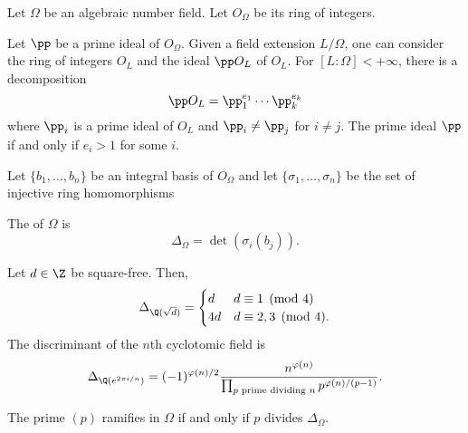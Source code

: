 \documentclass [preview, border = 20pt] {standalone}
\begin{document}
\pagecolor{black}
\color{white}

\setlength{\parskip}{1 em}

Let $\Omega$ be an algebraic number field. Let $O_\Omega$ be its ring of integers. 

Let $\pp$ be a prime ideal of $ O_\Omega$. Given a field extension $L/\Omega$, one can consider the ring of integers $ O_L$ and the ideal $\pp O_L$ of $ O_L$. For $[L:\Omega]<+\infty$, there is a decomposition
\[
\pp  O_L = \pp_1^{e_1} \cdots \pp_k^{e_k}
\]
where $\pp_i$ is a prime ideal of $ O_L$ and $\pp_i\ne \pp_j$ for $i\ne j$. The prime ideal $\pp$  if and only if $e_i>1$ for some $i$. 

Let $\{b_1,\hdots,b_n\}$ be an integral basis of $ O_\Omega$ and let $\{\sigma_1,\hdots,\sigma_n\}$ be the set of injective ring homomorphisms
\begin{center}
\end{center}
The  of $\Omega$ is
\[
\Delta_\Omega = \det(\sigma_i(b_j)).
\]

Let $d\in \Z$ be square-free. Then,
\[
\Delta_{\Q(\sqrt d)} = \begin{cases}
d&{d\equiv 1\pmod 4}\\ 4d & d\equiv 2,3\pmod 4.
\end{cases}
\]
The discriminant of the $n$th cyclotomic field is 
\[
\Delta_{\Q(e^{2\pi i/n})} = (-1)^{\varphi(n)/2} \frac{n^{\varphi(n)}}{\prod_{\textrm{$p$ prime dividing $n$}} p^{\varphi(n)/(p-1)}}.
\]

The prime $(p)$ ramifies in $\Omega$ if and only if $p$ divides $\Delta_\Omega$.
\end{document}
